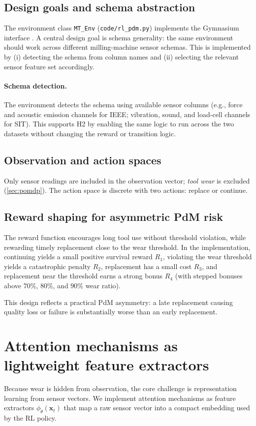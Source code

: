 \documentclass[11pt]{article}
\begin{document}
\subsection{Design goals and schema abstraction}
The environment class \texttt{MT\_Env} (\texttt{code/rl\_pdm.py}) implements the Gymnasium interface \parencite{Gymnasium2023}. A central design goal is schema generality: the same environment should work across different milling-machine sensor schemas. This is implemented by (i) detecting the schema from column names and (ii) selecting the relevant sensor feature set accordingly.

\paragraph{Schema detection.}
The environment detects the schema using available sensor columns (e.g., force and acoustic emission channels for IEEE; vibration, sound, and load-cell channels for SIT). This supports H2 by enabling the same logic to run across the two datasets without changing the reward or transition logic.

\subsection{Observation and action spaces}
Only sensor readings are included in the observation vector; \emph{tool wear} is excluded (\cref{sec:pomdp}). The action space is discrete with two actions: replace or continue.

\subsection{Reward shaping for asymmetric PdM risk}
\label{sec:reward}
The reward function encourages long tool use without threshold violation, while rewarding timely replacement close to the wear threshold. In the implementation, continuing yields a small positive survival reward $R_1$, violating the wear threshold yields a catastrophic penalty $R_2$, replacement has a small cost $R_3$, and replacement near the threshold earns a strong bonus $R_4$ (with stepped bonuses above 70\%, 80\%, and 90\% wear ratio).

This design reflects a practical PdM asymmetry: a late replacement causing quality loss or failure is substantially worse than an early replacement.

\section{Attention mechanisms as lightweight feature extractors}
\label{sec:attention}
Because wear is hidden from observation, the core challenge is representation learning from sensor vectors. We implement attention mechanisms as feature extractors $\phi_\theta(\mathbf{x}_t)$ that map a raw sensor vector into a compact embedding used by the RL policy.
\end{document}
